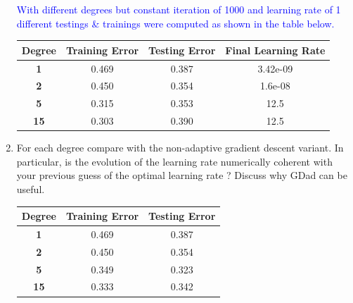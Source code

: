 \documentclass[a4paper]{article}
\begin{document}
\begin{enumerate}
\begin{minipage}[b]{0.4\textwidth}
 \captionsetup{justification=centering}
  \label{ad_gradient_descent_15_1_1000}
\end{minipage}
\textcolor{blue}{With different degrees but constant iteration of 1000 and learning rate of 1 different testings \& trainings were computed as shown in the table below. }
\begin{table}[!h]
\centering
\label{GDad}
\begin{tabular}{|c|c|c|c|}
\hline
  \textbf{Degree} & \textbf{Training Error} & \textbf{Testing Error} & \textbf{Final Learning Rate} \\ \hline
  \textbf{1}      & 0.469                            & 0.387                  & 3.42e-09                              \\ \hline
  \textbf{2}      & 0.450                            & 0.354                  & 1.6e-08                               \\ \hline
  \textbf{5}      & 0.315                            & 0.353                  & 12.5                                  \\ \hline
  \textbf{15}     & 0.303                            & 0.390                  & 12.5                                  \\ \hline
\end{tabular}
\end{table}
\item  For each degree compare with the non-adaptive gradient descent variant. In particular, is the evolution of the learning rate numerically coherent with your previous guess of the optimal learning rate ? Discuss why GDad can be useful.\\
\begin{table}[!h]
\centering
\label{ad}
\begin{tabular}{|c|c|c|}
\hline
\textbf{Degree} & \textbf{Training Error} & \textbf{Testing Error} \\ \hline
\textbf{1}      & 0.469                  & 0.387                  \\ \hline
\textbf{2}      & 0.450                  & 0.354                  \\ \hline
\textbf{5}      & 0.349                  & 0.323                  \\ \hline
\textbf{15}     & 0.333                  & 0.342                  \\ \hline
\end{tabular}

\end{table}
\end{enumerate}
\end{document}
